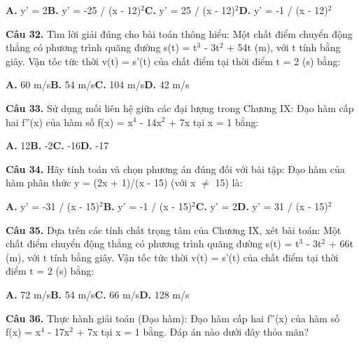 \documentclass[11pt,a4paper]{article}
\begin{document}
\hspace*{1.5em}\textbf{A.} y' = 2\quad\quad \textbf{B.} y' = -25 / (x - 12)$^2$\quad\quad \textbf{C.} y' = 25 / (x - 12)$^2$\quad\quad \textbf{D.} y' = -1 / (x - 12)$^2$\par\vspace{2pt}
\textbf{\color{primary} Câu 32.} Tìm lời giải đúng cho bài toán thông hiểu: Một chất điểm chuyển động thẳng có phương trình quãng đường s(t) = t$^3$ - 3t$^2$ + 54t (m), với t tính bằng giây. Vận tốc tức thời v(t) = s'(t) của chất điểm tại thời điểm t = 2 (s) bằng:\par
\hspace*{1.5em}\textbf{A.} 60 m/s\quad\quad \textbf{B.} 54 m/s\quad\quad \textbf{C.} 104 m/s\quad\quad \textbf{D.} 42 m/s\par\vspace{2pt}
\textbf{\color{primary} Câu 33.} Sử dụng mối liên hệ giữa các đại lượng trong Chương IX: Đạo hàm cấp hai f''(x) của hàm số f(x) = x$^4$ - 14x$^2$ + 7x tại x = 1 bằng:\par
\hspace*{1.5em}\textbf{A.} 12\quad\quad \textbf{B.} -2\quad\quad \textbf{C.} -16\quad\quad \textbf{D.} -17\par\vspace{2pt}
\textbf{\color{primary} Câu 34.} Hãy tính toán và chọn phương án đúng đối với bài tập: Đạo hàm của hàm phân thức y = (2x + 1)/(x - 15) (với x $\ne$ 15) là:\par
\hspace*{1.5em}\textbf{A.} y' = -31 / (x - 15)$^2$\quad\quad \textbf{B.} y' = -1 / (x - 15)$^2$\quad\quad \textbf{C.} y' = 2\quad\quad \textbf{D.} y' = 31 / (x - 15)$^2$\par\vspace{2pt}
\textbf{\color{primary} Câu 35.} Dựa trên các tính chất trọng tâm của Chương IX, xét bài toán: Một chất điểm chuyển động thẳng có phương trình quãng đường s(t) = t$^3$ - 3t$^2$ + 66t (m), với t tính bằng giây. Vận tốc tức thời v(t) = s'(t) của chất điểm tại thời điểm t = 2 (s) bằng:\par
\hspace*{1.5em}\textbf{A.} 72 m/s\quad\quad \textbf{B.} 54 m/s\quad\quad \textbf{C.} 66 m/s\quad\quad \textbf{D.} 128 m/s\par\vspace{2pt}
\textbf{\color{primary} Câu 36.} Thực hành giải toán (Đạo hàm): Đạo hàm cấp hai f''(x) của hàm số f(x) = x$^4$ - 17x$^2$ + 7x tại x = 1 bằng. Đáp án nào dưới đây thỏa mãn?\par
\end{document}
